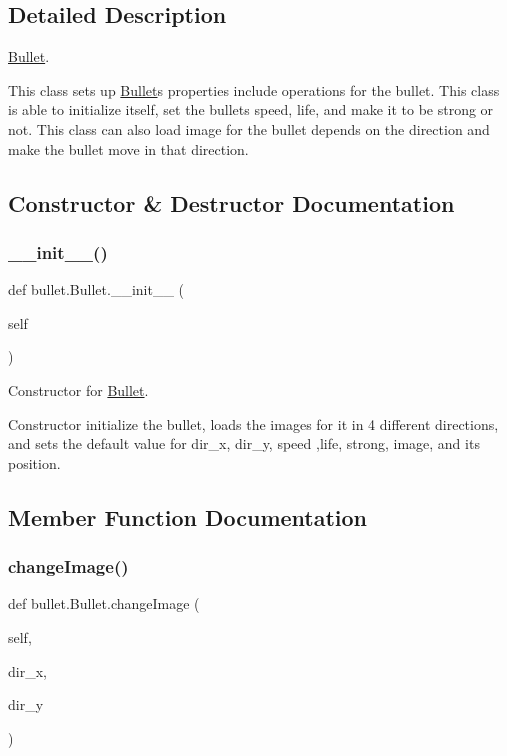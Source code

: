 \subsection{Detailed Description}
\mbox{\hyperlink{classbullet_1_1_bullet}{Bullet}}. 

This class sets up \mbox{\hyperlink{classbullet_1_1_bullet}{Bullet}}\textquotesingle{}s properties include operations for the bullet. This class is able to initialize itself, set the bullet\textquotesingle{}s speed, life, and make it to be strong or not. This class can also load image for the bullet depends on the direction and make the bullet move in that direction. 

\subsection{Constructor \& Destructor Documentation}
\mbox{\label{classbullet_1_1_bullet_a1c93c82a0a9c18dd9513e1ee5838d50b}} 
\subsubsection{\texorpdfstring{\_\_init\_\_()}{\_\_init\_\_()}}
{\footnotesize\ttfamily def bullet.\+Bullet.\+\_\+\+\_\+init\+\_\+\+\_\+ (\begin{DoxyParamCaption}\item[{}]{self }\end{DoxyParamCaption})}



Constructor for \mbox{\hyperlink{classbullet_1_1_bullet}{Bullet}}. 

Constructor initialize the bullet, loads the images for it in 4 different directions, and sets the default value for dir\+\_\+x, dir\+\_\+y, speed ,life, strong, image, and its position. 

\subsection{Member Function Documentation}
\mbox{\label{classbullet_1_1_bullet_ab263dc8a2f65deb49402c585b01ba0fd}} 
\subsubsection{\texorpdfstring{changeImage()}{changeImage()}}
{\footnotesize\ttfamily def bullet.\+Bullet.\+change\+Image (\begin{DoxyParamCaption}\item[{}]{self,  }\item[{}]{dir\+\_\+x,  }\item[{}]{dir\+\_\+y }\end{DoxyParamCaption})}



